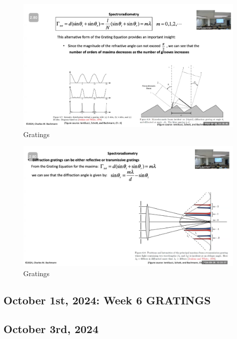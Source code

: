 \documentclass{article}
\begin{document}
\begin{figure}[h!]
\centering
\includegraphics[scale=.4]{Radiometry/Week5/Notes/Gratings/MUM8.png}
\caption{Gratings}
\label{fig:Blackbody}
\end{figure}

\begin{figure}[h!]
\centering
\includegraphics[scale=.4]{Radiometry/Week5/Notes/Gratings/MUM9.png}
\caption{Gratings}
\label{fig:Blackbody}
\end{figure}


\subsection{October 1st, 2024: Week 6 GRATINGS}



\clearpage


\subsection{October 3rd, 2024}
\end{document}
